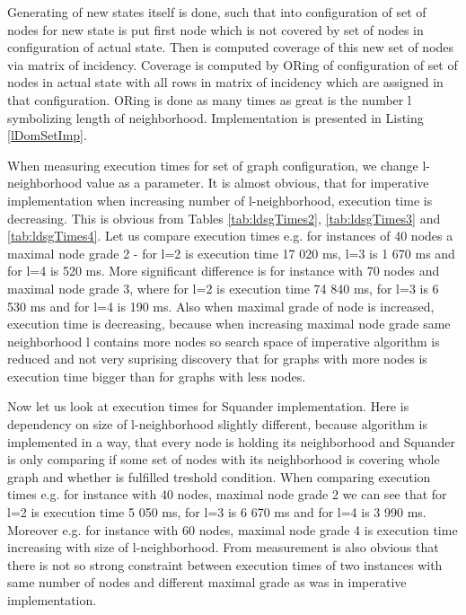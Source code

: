 \documentclass[11pt,twoside,a4paper]{book}
\begin{document}
Generating of new states itself is done, such that into configuration of set of
nodes for new state is put first node which is not covered by set of nodes in
configuration of actual state. Then is computed coverage of this new set of
nodes via matrix of incidency. Coverage is computed by ORing of configuration of
set of nodes in actual state with all rows in matrix of incidency which are
assigned in that configuration. ORing is done as many times as great is the
number l symbolizing length of neighborhood. Implementation is presented in
Listing \ref{lDomSetImp}.
\newpage

\newpage
When measuring execution times for set of graph configuration, we change
l-neighborhood value as a parameter. It is almost obvious, that for imperative
implementation when increasing number of l-neighborhood, execution time is
decreasing. This is obvious from Tables \ref{tab:ldsgTimes2},
\ref{tab:ldsgTimes3} and \ref{tab:ldsgTimes4}. Let us compare execution
times e.g. for instances of 40 nodes a maximal node grade 2 - for l=2 is
execution time 17 020 ms, l=3 is 1 670 ms and for l=4 is 520 ms. More significant
difference is for instance with 70 nodes and maximal node grade 3, where for
l=2 is execution time 74 840 ms, for l=3 is 6 530 ms and for l=4 is 190 ms.
Also when maximal grade of node is increased, execution time is decreasing,
because when increasing maximal node grade same neighborhood l contains more
nodes so search space of imperative algorithm is reduced and not very suprising
discovery that for graphs with more nodes is execution time bigger than for
graphs with less nodes.

Now let us look at execution times for Squander implementation. Here is
dependency on size of l-neighborhood slightly different, because algorithm is
implemented in a way, that every node is holding its neighborhood and Squander
is only comparing if some set of nodes with its neighborhood is covering whole
graph and whether is fulfilled treshold condition. When comparing execution
times e.g. for instance with 40 nodes, maximal node grade 2 we can see that for
l=2 is execution time 5 050 ms, for l=3 is 6 670 ms and for l=4 is 3 990 ms.
Moreover e.g. for instance with 60 nodes, maximal node grade 4 is execution
time increasing with size of l-neighborhood. From measurement is also obvious
that there is not so strong constraint between execution times of two instances
with same number of nodes and different maximal grade as was in imperative
implementation.
\end{document}
